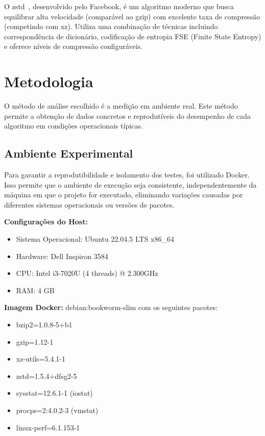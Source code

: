 \documentclass[acmsmall]{acmart}
\begin{document}
O zstd~\cite{zstd}, desenvolvido pelo Facebook, é um algoritmo moderno que busca equilibrar alta velocidade (comparável ao gzip) com excelente taxa de compressão (competindo com xz). Utiliza uma combinação de técnicas incluindo correspondência de dicionário, codificação de entropia FSE (Finite State Entropy) e oferece níveis de compressão configuráveis.

\section{Metodologia}

O método de análise escolhido é a medição em ambiente real. Este método permite a obtenção de dados concretos e reprodutíveis do desempenho de cada algoritmo em condições operacionais típicas.

\subsection{Ambiente Experimental}

Para garantir a reprodutibilidade e isolamento dos testes, foi utilizado Docker. Isso permite que o ambiente de execução seja consistente, independentemente da máquina em que o projeto for executado, eliminando variações causadas por diferentes sistemas operacionais ou versões de pacotes.

\textbf{Configurações do Host:}
\begin{itemize}
  \item Sistema Operacional: Ubuntu 22.04.5 LTS x86\_64
  \item Hardware: Dell Inspiron 3584
  \item CPU: Intel i3-7020U (4 threads) @ 2.300GHz
  \item RAM: 4 GB
\end{itemize}

\textbf{Imagem Docker:} debian:bookworm-slim com os seguintes pacotes:
\begin{itemize}
  \item bzip2=1.0.8-5+b1
  \item gzip=1.12-1
  \item xz-utils=5.4.1-1
  \item zstd=1.5.4+dfsg2-5
  \item sysstat=12.6.1-1 (iostat)
  \item procps=2:4.0.2-3 (vmstat)
  \item linux-perf=6.1.153-1
\end{itemize}
\end{document}
